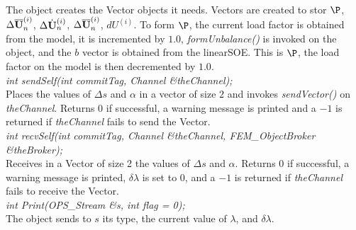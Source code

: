 \\ 
The object creates the Vector objects it needs. Vectors are created to
stor $\P$, $\Delta \overline{\bf U}_n^{(i)}$, $\Delta \dot{\bf U}_n^{(i)}$, $\Delta
\overline{\bf U}_n^{(i)}$, $dU^{(i)}$. To form $\P$, the current load factor is
obtained from the model, it is incremented by $1.0$, {\em
formUnbalance()} is invoked on the object, and the $b$ vector is
obtained from the linearSOE. This is $\P$, the load factor on the
model is then decremented by $1.0$. \\

{\em int sendSelf(int commitTag, Channel \&theChannel); } \\ 
Places the values of $\Delta s$ and $\alpha$ in a
vector of size $2$ and invokes {\em sendVector()} on {\em theChannel}.
Returns $0$ if successful, a warning message is printed and
a $-1$ is returned if {\em theChannel} fails to send the Vector. \\

{\em int recvSelf(int commitTag, Channel \&theChannel, 
FEM\_ObjectBroker \&theBroker); } \\ 
Receives in a Vector of size 2 the values of $\Delta s$ and $\alpha$.
Returns $0$ if successful, a warning message is printed, $\delta
\lambda$ is set to $0$, and a $-1$ is returned if {\em theChannel}
fails to receive the Vector.\\

{\em int Print(OPS_Stream \&s, int flag = 0);}\\
The object sends to $s$ its type, the current value of $\lambda$, and
$\delta \lambda$. 
